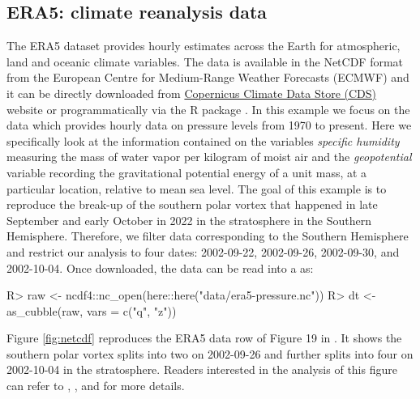 \documentclass[
]{jss}
\begin{document}
\hypertarget{era5-climate-reanalysis-data}{%
\subsection{ERA5: climate reanalysis data}\label{era5-climate-reanalysis-data}}

The ERA5 dataset \citep{hersbach2020era5} provides hourly estimates across the Earth for atmospheric, land and oceanic climate variables. The data is available in the NetCDF format from the European Centre for Medium-Range Weather Forecasts (ECMWF) and it can be directly downloaded from \href{https://cds.climate.copernicus.eu/cdsapp\#!/dataset/reanalysis-era5-pressure-levels?tab=overview}{Copernicus Climate Data Store (CDS)} website or programmatically via the R package  \citep{ecwmfr}. In this example we focus on the  data which provides hourly data on pressure levels from 1970 to present. Here we specifically look at the information contained on the variables \emph{specific humidity} measuring the mass of water vapor per kilogram of moist air and the \emph{geopotential} variable recording the gravitational potential energy of a unit mass, at a particular location, relative to mean sea level. The goal of this example is to reproduce the break-up of the southern polar vortex that happened in late September and early October in 2022 in the stratosphere in the Southern Hemisphere. Therefore, we filter data corresponding to the Southern Hemisphere and restrict our analysis to four dates: 2002-09-22, 2002-09-26, 2002-09-30, and 2002-10-04. Once downloaded, the data can be read into a  as:

\begin{CodeChunk}
\begin{CodeInput}
R> raw <- ncdf4::nc_open(here::here("data/era5-pressure.nc"))
R> dt <- as_cubble(raw, vars = c("q", "z"))
\end{CodeInput}
\end{CodeChunk}

Figure \ref{fig:netcdf} reproduces the ERA5 data row of Figure 19 in \citet{hersbach2020era5}. It shows the southern polar vortex splits into two on 2002-09-26 and further splits into four on 2002-10-04 in the stratosphere. Readers interested in the analysis of this figure can refer to \citet{hersbach2020era5}, \citet{simmons2020global}, and \citet{simmons2005ecmwf} for more details.
\end{document}
